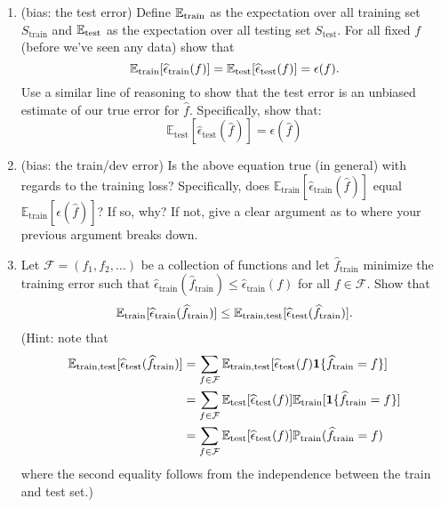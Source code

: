\begin{enumerate}
\item {} (bias: the test error) Define $\mathbb{E}_{\textrm{train}}$ as the expectation over all training set $S_{\textrm{train}}$ and $\mathbb{E}_{\textrm{test}}$ as the expectation over all testing set $S_{\textrm{test}}$. For all fixed $f$ (before we've seen any data) show that
\[\mathbb{E}_{\textrm{train}}[ \widehat{\epsilon}_{\textrm{train}}(f) ] = \mathbb{E}_{\textrm{test}}[ \widehat{\epsilon}_{\textrm{test}}(f) ] = \epsilon(f).\] 
Use a similar line of reasoning to show that the test error is an
unbiased estimate of our true error for $\hat{f}$. Specifically, show
that:
\[
  \mathbb{E}_{\textrm{test}}[\widehat{\epsilon}_{\textrm{test}}(\widehat{f})] = \epsilon(\widehat{f})
\]


\item {} (bias: the train/dev error) Is the above equation true (in general) with regards to the
  training loss? Specifically, does $\mathbb{E}_{\textrm{train}}[\widehat{\epsilon}_{\textrm{train}}(\widehat{f})]$ equal $\mathbb{E}_{\textrm{train}}[ \epsilon(\widehat{f})]$? If so, why? If not, give a clear argument as
  to where your previous argument breaks down.


\item {} Let $\mathcal{F} = (f_1, f_2,\dots)$ be a collection of functions and let $\widehat{f}_{\textrm{train}}$ minimize the training error such that $\widehat{\epsilon}_{\textrm{train}}(\widehat{f}_{\textrm{train}}) \leq \widehat{\epsilon}_{\textrm{train}}(f)$ for all $f \in \mathcal{F}$.
Show that
\begin{align*}
\mathbb{E}_{\text{train}}[ \widehat{\epsilon}_{\textrm{train}}(\widehat{f}_{\textrm{train}}) ] \leq \mathbb{E}_{\text{train,test}}[ \widehat{\epsilon}_{\textrm{test}}(\widehat{f}_{\textrm{train}}) ].
\end{align*}
(Hint: 
note that
\begin{align*}
\mathbb{E}_{\text{train,test}}[ \widehat{\epsilon}_{\textrm{test}}(\widehat{f}_{\textrm{train}}) ] &= \sum_{f \in \mathcal{F}} \mathbb{E}_{\text{train,test}}[ \widehat{\epsilon}_{\textrm{test}}(f) \mathbf{1}\{ \widehat{f}_{\textrm{train}} = f\}] \\
&= \sum_{f \in \mathcal{F}} \mathbb{E}_{\text{test}}[ \widehat{\epsilon}_{\textrm{test}}(f) ] \mathbb{E}_{\text{train}}[ \mathbf{1}\{\widehat{f}_{\textrm{train}} = f \}]\\ &= \sum_{f \in \mathcal{F}} \mathbb{E}_{\text{test}}[ \widehat{\epsilon}_{\textrm{test}}(f) ] \mathbb{P}_{\text{train}}(\widehat{f}_{\textrm{train}} = f )
\end{align*}
where the second equality follows from the independence between the train and test set.)\\


\end{enumerate}  
